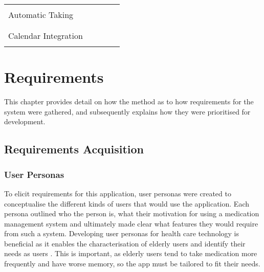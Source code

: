 \documentclass{l4proj}
\newcommand{\xmark}{\ding{55}}%
\begin{document}
\begin{table}[!ht]
\begin{tabular}{ | P{3.3cm} | P{2cm}  P{2cm}  P{2cm}  P{2cm} | }
         & & & & \\
        \hline
         & & & & \\
        Automatic Taking & \large{\xmark} &  \large{\xmark}  &  \large{\xmark}  &  \large{\xmark} \\
         & & & & \\
         \hline
          & & & & \\
         Calendar Integration & \large{\xmark} &  \large{\xmark}  &  \large{\xmark}  &  \large{\xmark} \\
          & & & & \\
        \hline
    \end{tabular}
    \newline
    \label{tab:appcomparison}
\end{table}



\chapter{Requirements}

This chapter provides detail on how the method as to how requirements for the system were gathered, and subsequently explains how they were prioritised for development.  

\section{Requirements Acquisition}

\subsection{User Personas}

To elicit requirements for this application, user personas were created to conceptualise the different kinds of users that would use the application. Each persona outlined who the person is, what their motivation for using a medication management system and ultimately made clear what features they would require from such a system. Developing user personas for health care technology is beneficial as it enables the characterisation of elderly users and identify their needs as users \citep{lerouge2013user}. This is important, as elderly users tend to take medication more frequently and have worse memory, so the app must be tailored to fit their needs.
\end{document}
